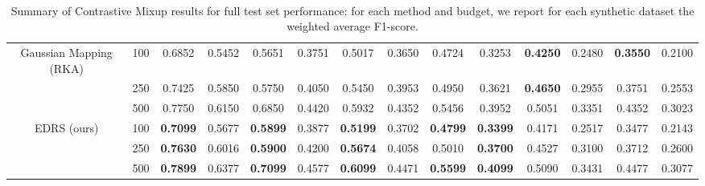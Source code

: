 \documentclass[preprint,12pt]{elsarticle}
\begin{document}
\begin{table}[!t]
{\begin{tabular}{cc|cc|cc|cc|cc|cc|cc}
Gaussian Mapping (RKA)        &  100       &  0.6852          &  0.5452                &  0.5651          &  0.3751                &  0.5017 &  0.3650                &  0.4724          &  0.3253                &  \textbf{0.4250} &  0.2480                &  \textbf{0.3550} &  0.2100          \\
                          &  250       &  0.7425          &  0.5850                &  0.5750          &  0.4050                &  0.5450 &  0.3953                &  0.4950          &  0.3621                &  \textbf{0.4650} &  0.2955                &  0.3751          &  0.2553          \\
                          &  500       &  0.7750          &  0.6150                &  0.6850          &  0.4420                &  0.5932 &  0.4352                &  0.5456          &  0.3952                &  0.5051          &  0.3351                &  0.4352          &  0.3023          \\ \hline

EDRS (ours)               & 100      & \textbf{0.7099} & \multicolumn{1}{l|}{0.5677}          & \textbf{0.5899} & \multicolumn{1}{l|}{0.3877}          & \textbf{0.5199}          & \multicolumn{1}{l|}{0.3702}          & \textbf{0.4799} & \multicolumn{1}{l|}{\textbf{0.3399}} & 0.4171          & \multicolumn{1}{l|}{0.2517}          & 0.3477          & 0.2143          \\
                          & 250      & \textbf{0.7630} & \multicolumn{1}{l|}{0.6016}          & \textbf{0.5900} & \multicolumn{1}{l|}{0.4200}          & \textbf{0.5674}          & \multicolumn{1}{l|}{0.4058}          & 0.5010          & \multicolumn{1}{l|}{\textbf{0.3700}} & 0.4527          & \multicolumn{1}{l|}{0.3100}          & 0.3712          & 0.2600          \\
                          & 500      & \textbf{0.7899} & \multicolumn{1}{l|}{0.6377}          & \textbf{0.7099} & \multicolumn{1}{l|}{0.4577}          & \textbf{0.6099}          & \multicolumn{1}{l|}{0.4471}          & \textbf{0.5599} & \multicolumn{1}{l|}{\textbf{0.4099}} & 0.5090          & \multicolumn{1}{l|}{0.3431}          & 0.4477          & 0.3077          \\ \hline
\end{tabular}
}
\caption{\\ Summary of Contrastive Mixup results for full test set performance: for each method and budget, we report for each synthetic dataset the weighted average F1-score.}
\label{tab:SSL_synt_datasets}
\end{table}
\end{document}
